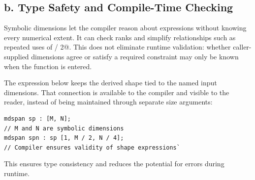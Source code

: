 \subsection*{\textbf{b. Type Safety and Compile-Time Checking}}

Symbolic dimensions let the compiler reason about expressions without knowing every numerical extent. It can check ranks and simplify relationships such as repeated uses of \co@M / 2@. This does not eliminate runtime validation: whether caller-supplied dimensions agree or satisfy a required constraint may only be known when the function is entered.

The expression below keeps the derived shape tied to the named input dimensions. That connection is available to the compiler and visible to the reader, instead of being maintained through separate size arguments:

\begin{lstlisting}[language=croqtile,caption={b. Type Safety and Compile-Time Checking}]
mdspan sp : [M, N];
// M and N are symbolic dimensions
mdspan spn : sp [1, M / 2, N / 4];
// Compiler ensures validity of shape expressions`
\end{lstlisting}

This ensures type consistency and reduces the potential for errors during runtime.
